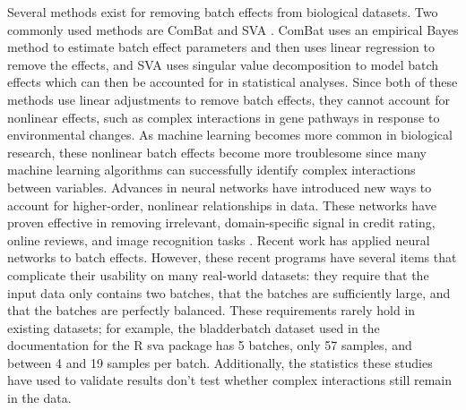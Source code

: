 \documentclass[notitlepage]{article}
\begin{document}
Several methods exist for removing batch effects from biological datasets.
Two commonly used methods are ComBat \citep{johnson_adjusting_2007} and SVA \citep{leek_capturing_2007}.
ComBat uses an empirical Bayes method to estimate batch effect parameters and then uses linear regression to remove the effects, and SVA uses singular value decomposition to model batch effects which can then be accounted for in statistical analyses.
Since both of these methods use linear adjustments to remove batch effects, they cannot account for nonlinear effects, such as complex interactions in gene pathways in response to environmental changes.
As machine learning becomes more common in biological research, these nonlinear batch effects become more troublesome since many machine learning algorithms can successfully identify complex interactions between variables.
Advances in neural networks have introduced new ways to account for higher-order, nonlinear relationships in data.
These networks have proven effective in removing irrelevant, domain-specific signal in credit rating, online reviews, and image recognition tasks \citep{louizos_variational_2015}.
Recent work \cite{shaham_removal_2017,shaham_batch_2018,upadhyay_removal_2019} has applied neural networks to batch effects.
However, these recent programs have several items that complicate their usability on many real-world datasets:
they require that the input data only contains two batches, that the batches are sufficiently large, and that the batches are perfectly balanced.
These requirements rarely hold in existing datasets; for example, the bladderbatch dataset used in the documentation for the R sva package \cite{leek_bladderbatch_2017,leek_sva_2017} has 5 batches, only 57 samples, and between 4 and 19 samples per batch.
Additionally, the statistics these studies have used to validate results don't test whether complex interactions still remain in the data.
\end{document}
